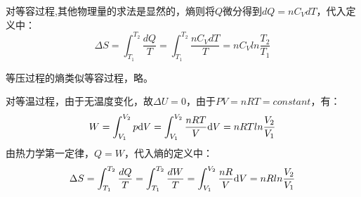         \begin{prove}
            对等容过程,其他物理量的求法是显然的，熵则将$Q$微分得到$dQ = nC_{V}dT$，代入定义中：
            \begin{equation}
                \Delta S = \int_{T_1}^{T_2} \frac{dQ}{T} = \int_{T_1}^{T_2} \frac{nC_{V}dT}{T} = nC_{V}ln\frac{T_2}{T_1}
            \end{equation}
            
            等压过程的熵类似等容过程，略。
        \end{prove}
        \begin{prove}
            对等温过程，由于无温度变化，故$\Delta U = 0$，由于$PV = nRT = constant$，有：
            \begin{equation}
                W = \int_{V_1}^{V_2} p \mathrm{d}{V} = \int_{V_1}^{V_2} \frac{nRT}{V} \mathrm{d}{V} = nRTln\frac{V_2}{V_1}
            \end{equation}
            由热力学第一定律，$Q = W$，代入熵的定义中：
            \begin{equation}
                \Delta S = \int_{T_1}^{T_2} \frac{dQ}{T} =\int_{T_1}^{T_2} \frac{dW}{T} =  \int_{V_1}^{V_2} \frac{nR}{V} \mathrm{d}{V} = nRln\frac{V_2}{V_1}
            \end{equation} 
        \end{prove}
